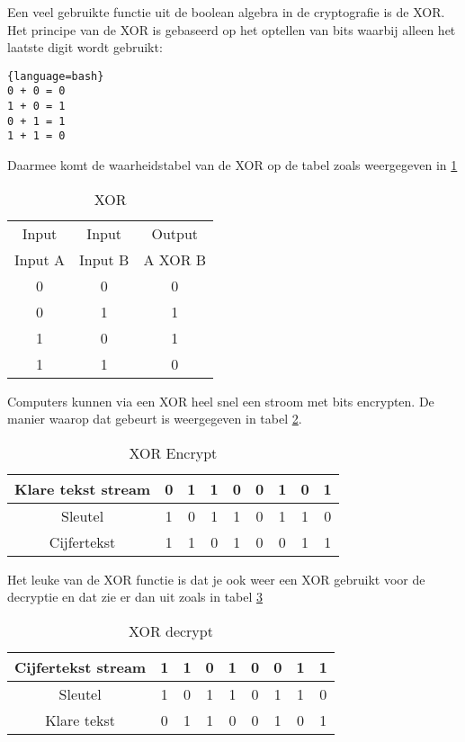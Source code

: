 Een veel gebruikte functie uit de boolean algebra in de cryptografie is de XOR. Het principe van de XOR is gebaseerd op het optellen van bits waarbij alleen het laatste digit wordt gebruikt:
\begin{lstlisting}{language=bash}
0 + 0 = 0
1 + 0 = 1
0 + 1 = 1
1 + 1 = 0
\end{lstlisting}

Daarmee komt de waarheidstabel van de XOR op de tabel zoals weergegeven in \ref{tab:xor}

\begin{table}[h]
\centering
\begin{tabular}{ | c | c | c| }
	\hline
	Input & Input & Output \\
	Input A & Input B & A XOR B \\
	\hline
	0 & 0 & 0 \\
	\hline
	0 & 1 & 1 \\
	\hline
	1 & 0 & 1 \\
	\hline
	1 & 1 & 0 \\
	\hline
\end{tabular}
\caption{XOR}
\label{tab:xor}
\end{table}

Computers kunnen via een XOR heel snel een stroom met bits encrypten. De manier waarop dat gebeurt is weergegeven in tabel \ref{tab:xor:encrypt}.

\begin{table}[h]
\centering
	\begin{tabular}{ |c|c|c|c|c|c|c|c|c| }
		\hline
		Klare tekst stream & 0 & 1 & 1 & 0 & 0 & 1 & 0 & 1 \\
		\hline
		Sleutel    & 1 & 0 & 1 & 1 & 0 & 1 & 1 & 0 \\
		\hline
		\hline
		Cijfertekst& 1 & 1 & 0 & 1 & 0 & 0 & 1 & 1 \\
		\hline
	\end{tabular}
	\caption{XOR Encrypt}
	\label{tab:xor:encrypt}
\end{table}

Het leuke van de XOR functie is dat je ook weer een XOR gebruikt voor de decryptie en dat zie er dan uit zoals in tabel \ref{tab:xor:decrypt}
\begin{table}[h]
\centering
	\begin{tabular}{ |c|c|c|c|c|c|c|c|c| }
		\hline
		Cijfertekst stream & 1 & 1 & 0 & 1 & 0 & 0 & 1 & 1 \\
		\hline
		Sleutel            & 1 & 0 & 1 & 1 & 0 & 1 & 1 & 0 \\
		\hline
		\hline
		Klare tekst        & 0 & 1 & 1 & 0 & 0 & 1 & 0 & 1 \\
		\hline
	\end{tabular}
	\caption{XOR decrypt}
	\label{tab:xor:decrypt}
\end{table}
